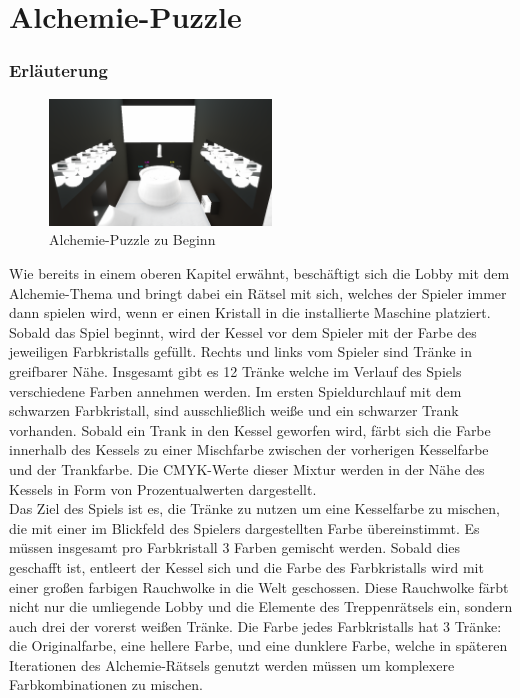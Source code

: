 \newpage




\section{Alchemie-Puzzle}
\subsubsection{Erläuterung}
\begin{figure}
	\vspace*{-0.5cm}
	\includegraphics[width=5.9cm]{Pictures/Alchemie}
	\caption{Alchemie-Puzzle zu Beginn}
	\vspace*{-0.5cm}
	\label{fig:alchemie_start}
\end{figure}
Wie bereits in einem oberen Kapitel erwähnt, beschäftigt sich die Lobby mit dem Alchemie-Thema und bringt dabei ein Rätsel mit sich, welches der Spieler immer dann spielen wird, wenn er einen Kristall in die installierte Maschine platziert. Sobald das Spiel beginnt, wird der Kessel vor dem Spieler mit der Farbe des jeweiligen Farbkristalls gefüllt. Rechts und links vom Spieler sind Tränke in greifbarer Nähe. Insgesamt gibt es 12 Tränke welche im Verlauf des Spiels verschiedene Farben annehmen werden. Im ersten Spieldurchlauf mit dem schwarzen Farbkristall, sind ausschließlich weiße und ein schwarzer Trank vorhanden. Sobald ein Trank in den Kessel geworfen wird, färbt sich die Farbe innerhalb des Kessels zu einer Mischfarbe zwischen der vorherigen Kesselfarbe und der Trankfarbe. Die CMYK-Werte dieser Mixtur werden in der Nähe des Kessels in Form von Prozentualwerten dargestellt.\\
Das Ziel des Spiels ist es, die Tränke zu nutzen um eine Kesselfarbe zu mischen, die mit einer im Blickfeld des Spielers dargestellten Farbe übereinstimmt. Es müssen insgesamt pro Farbkristall 3 Farben gemischt werden. Sobald dies geschafft ist, entleert der Kessel sich und die Farbe des Farbkristalls wird mit einer großen farbigen Rauchwolke in die Welt geschossen. Diese Rauchwolke färbt nicht nur die umliegende Lobby und die Elemente des Treppenrätsels ein, sondern auch drei der vorerst weißen Tränke. Die Farbe jedes Farbkristalls hat 3 Tränke: die Originalfarbe, eine hellere Farbe, und eine dunklere Farbe, welche in späteren Iterationen des Alchemie-Rätsels genutzt werden müssen um komplexere Farbkombinationen zu mischen.\\

